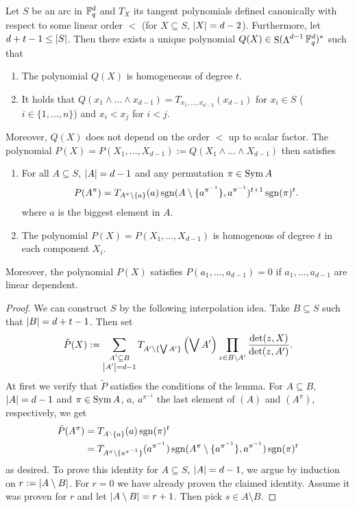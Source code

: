 \documentclass[a4paper]{article}
\begin{document}
\begin{lemma}
  Let $S$ be an arc in $\mathbb{F}_{q}^d$ and $T_X$ its tangent polynomials
  defined canonically with respect to some linear order $<$ (for
  $X\subseteq S$, $\left|X\right|=d-2$). Furthermore, let $d+t-1\leq
  \left|S\right|$. Then there exists a unique polynomial $Q(X)\in
  \mathop\mathrm{S}(\mathop\mathrm{\Lambda}^{d-1}{\mathbb{F}_{q}^d)^*}$ such that
  \begin{enumerate}
  \item The polynomial $Q(X)$ is homogeneous of degree $t$.
  \item It holds that $Q(x_1\wedge\ldots\wedge
    x_{d-1})=T_{x_1,\ldots,x_{d-2}}(x_{d-1})$ for $x_i\in S$
    ($i\in\{1,\ldots,n\}$) and $x_i<x_j$ for $i<j$.
  \end{enumerate}

  Moreover, $Q(X)$ does not depend on the order $<$ up to scalar factor.
  The polynomial $P(X)=P(X_1,\ldots,X_{d-1}):=Q(X_1\wedge\ldots\wedge
  X_{d-1})$ then satisfies

  \begin{enumerate}
  \item For all $A\subseteq S$, $\left|A\right|=d-1$ and any permutation $\pi\in\mathop\mathrm{Sym}{A}$
    \begin{align}
      P(A^\pi)=T_{A^\pi\setminus\{a\}}(a)\mathop\mathrm{sgn}(A\setminus\{a^{\pi^{-1}}\},a^{\pi^{-1}})^{t+1}\mathop\mathrm{sgn}(\pi)^t\text{.}
    \end{align}
    where $a$ is the biggest element in $A$.
  \item The polynomial $P(X)=P(X_1,\ldots,X_{d-1})$ is homogenous of
    degree $t$ in each component $X_i$.
  \end{enumerate}
  Moreover, the polynomial $P(X)$ satisfies $P(a_1,\ldots,a_{d-1})=0$ if
  $a_1,\ldots,a_{d-1}$ are linear dependent.
\end{lemma}

\begin{proof}
  We can construct $S$ by the following interpolation idea. Take
  $B\subseteq S$ such that $\left|B\right|=d+t-1$. Then set
  \begin{align}
    \tilde{P}(X):=\sum_{\substack{A'\subseteq B\\
        \left|A'\right|=d-1}}{T_{A'\setminus\{\mathop\mathrm{\bigvee}{A'}\}}\left(\mathop\mathrm{\bigvee}{A'}\right)\prod_{z\in
        B\setminus A'}{\frac{\det(z,X)}{\det(z,A')}}}\text{.}
  \end{align}
  At first we verify that $\tilde{P}$ satisfies the conditions of the
  lemma. For $A\subseteq B$, $\left|A\right|=d-1$ and $\pi\in\mathop\mathrm{Sym}{A}$, $a$, $a^{\pi^{-1}}$
  the last element of $(A)$ and $(A^\pi)$, respectively, we get
  \begin{align}
    \tilde{P}(A^\pi)
    &= T_{A^\setminus\{a\}}(a)\mathop\mathrm{sgn}(\pi)^t\\
    &= T_{A^\pi\setminus\{a^{\pi^{-1}}\}}(a^{\pi^{-1}})\mathop\mathrm{sgn}(A^\pi\setminus\{a^{\pi^{-1}}\},a^{\pi^{-1}})\mathop\mathrm{sgn}(\pi)^t
  \end{align}
  as desired. To prove this identity for $A\subseteq S$, $\left|A\right|=d-1$,
  we argue by induction on $r:=\left|A\setminus B\right|$. For $r=0$ we have
  already proven the claimed identity. Assume it was proven for $r$ and
  let $\left|A\setminus B\right|=r+1$. Then pick $s\in A\setminus B$.
\end{proof}
\end{document}
